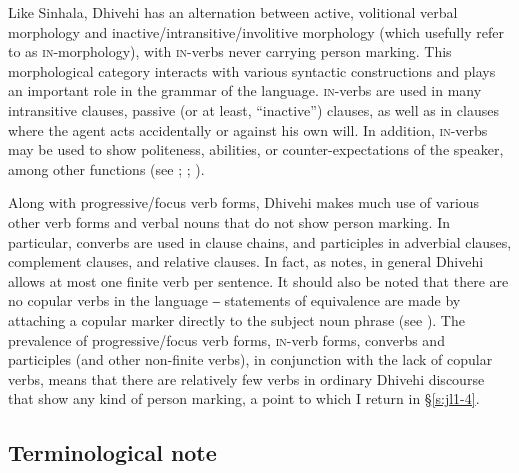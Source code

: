 \documentclass[output=paper]{langsci/langscibook}
\begin{document}
Like Sinhala, Dhivehi has an alternation between active, volitional verbal morphology and inactive/intransitive/involitive morphology (which \citealt{CainGair2000} usefully refer to as \textsc{in}-morphology), with \textsc{in}-verbs never carrying person marking. This morphological category interacts with various syntactic constructions and plays an important role in the grammar of the language. \textsc{in}-verbs are used in many intransitive clauses, passive (or at least, “inactive”) clauses, as well as in clauses where the agent acts accidentally or against his own will. In addition, \textsc{in}-verbs may be used to show politeness, abilities, or counter-expectations of the speaker, among other functions (see \citealt{Cain1995}; \citealt[56--60]{CainGair2000}; \citealt[248--257]{Gnanadesikan2017}).

Along with progressive/focus verb forms, Dhivehi makes much use of various other verb forms and verbal nouns that do not show person marking. In particular, converbs are used in clause chains, and participles in adverbial clauses, complement clauses, and relative clauses. In fact, as \cite[289]{Gnanadesikan2017} notes, in general Dhivehi allows at most one finite verb per sentence. It should also be noted that there are no copular verbs in the language ‒ statements of equivalence are made by attaching a copular marker directly to the subject noun phrase (see \citealt[236--237]{Gnanadesikan2017}). The prevalence of progressive/focus verb forms, \textsc{in}-verb forms, converbs and participles (and other non-finite verbs), in conjunction with the lack of copular verbs, means that there are relatively few verbs in ordinary Dhivehi discourse that show any kind of person marking, a point to which I return in §\ref{s:jl1-4}.



\subsection{Terminological note}\label{s:jl1-3}
\end{document}
